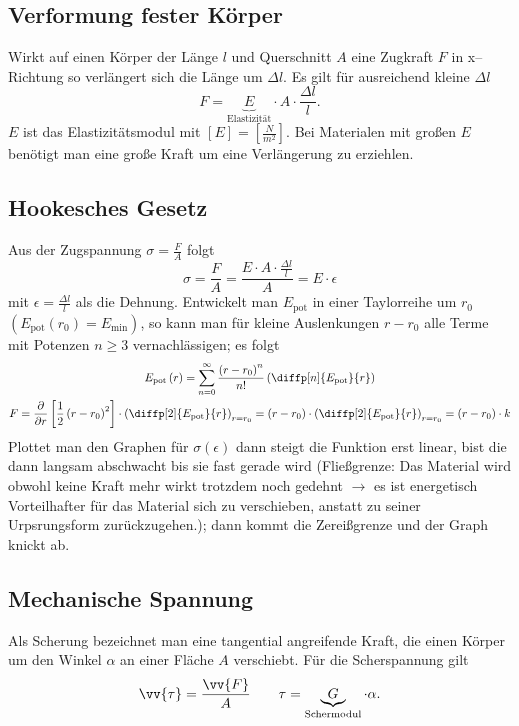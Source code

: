 \documentclass[a4paper,12pt]{article}
\begin{document}
\subsection{Verformung fester Körper}
Wirkt auf einen Körper der Länge $l$ und Querschnitt $A$ eine Zugkraft $F$ in x--Richtung so verlängert sich die Länge um $\Delta l$. Es gilt für ausreichend kleine $\Delta l$ 
\[ 
        F=\underbrace{E}_{\text{Elastizität}}\cdot A\cdot \dfrac{\Delta l}{l}
.\] 
$E$ ist das Elastizitätsmodul mit $[E]=[\tfrac{N}{m^2}]$. Bei Materialen mit großen $E$ benötigt man eine große Kraft um eine Verlängerung zu erziehlen. 
\subsection{Hookesches Gesetz}
Aus der Zugspannung $\sigma =\tfrac{F}{A}$ folgt 
\[ 
        \sigma =\dfrac{F}{A}=\dfrac{E\cdot A\cdot \tfrac{\Delta l}{l}}{A}=E\cdot \epsilon
\] 
mit $\epsilon=\tfrac{\Delta l}{l}$ als die Dehnung. Entwickelt man $E_{\text{pot}}$ in einer Taylorreihe um $r_0$ $\left(E_{\text{pot}}\left(r_0\right)=E_{\text{min}}\right)$, so kann man für kleine Auslenkungen $r-r_0$ alle Terme mit Potenzen $n\geq 3$ vernachlässigen; es folgt
\begin{gather*}
        E_{\text{pot}}\left(r\right)=\sum_{n=0}^{\infty}\dfrac{\left(r-r_0\right)^n}{n!}\left(\diffp[n]{E_{\text{pot} }}{r}\right)\\
        F=\dfrac{\partial}{\partial r}\left[\dfrac{1}{2}\left(r-r_0\right)^2\right]\cdot \left(\diffp[2]{E_{\text{pot} }}{r}\right)_{r=r_0}=\left(r-r_0\right)\cdot \left(\diffp[2]{E_{\text{pot}} }{r}\right)_{r=r_0}=\left(r-r_0\right)\cdot k
\end{gather*}
Plottet man den Graphen für $\sigma \left(\epsilon\right)$ dann steigt die Funktion erst linear, bist die dann langsam abschwacht bis sie fast gerade wird (Fließgrenze: Das Material wird obwohl keine Kraft mehr wirkt trotzdem noch gedehnt $\rightarrow $ es ist energetisch Vorteilhafter für das Material sich zu verschieben, anstatt zu seiner Urpsrungsform zurückzugehen.); dann kommt die Zereißgrenze und der Graph knickt ab.

\subsection{Mechanische Spannung}
Als Scherung bezeichnet man eine tangential angreifende Kraft, die einen Körper um den Winkel $\alpha $ an einer Fläche $A$ verschiebt. Für die Scherspannung gilt
\[ 
        \vv{\tau }=\dfrac{\vv{F}}{A}\qquad \tau =\underbrace{G}_{\text{Schermodul}}\cdot \alpha 
.\] 
\end{document}
